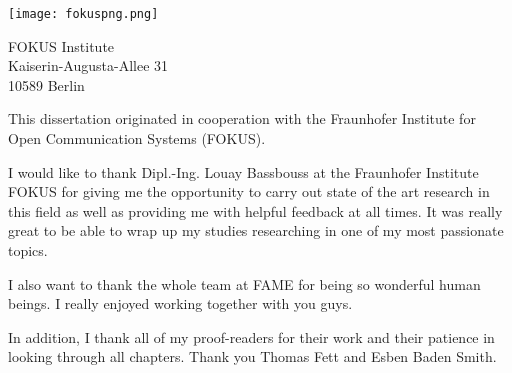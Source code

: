\thispagestyle{empty}
\vspace*{3cm}


\begin{center}
\texttt{[image: fokuspng.png]}
\end{center}

\vspace*{0.2cm}

\begin{center}
FOKUS Institute\\
Kaiserin-Augusta-Allee 31\\
10589 Berlin\\
\end{center}
\vspace*{0.5cm}

\noindent This dissertation originated in cooperation with the Fraunhofer Institute for Open Communication Systems (FOKUS).

\vspace*{1cm}
\noindent
I would like to thank Dipl.-Ing. Louay Bassbouss at the Fraunhofer Institute FOKUS for giving me the opportunity to carry out state of the art research in this field as well as providing me with helpful feedback at all times. It was really great to be able to wrap up my studies researching in one of my most passionate topics.

\vspace*{1cm}
\noindent
I also want to thank the whole team at FAME for being so wonderful human beings. I really enjoyed working together with you guys.

\vspace*{1cm}
\noindent In addition, I thank all of my proof-readers for their work and their patience in looking through all chapters. Thank you Thomas Fett and Esben Baden Smith.\\
